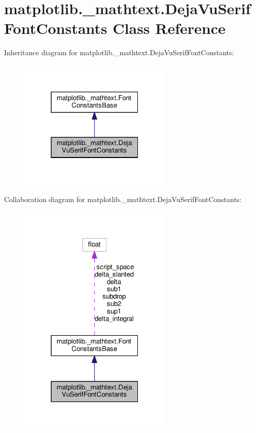 \hypertarget{classmatplotlib_1_1__mathtext_1_1DejaVuSerifFontConstants}{}\section{matplotlib.\+\_\+mathtext.\+Deja\+Vu\+Serif\+Font\+Constants Class Reference}
\label{classmatplotlib_1_1__mathtext_1_1DejaVuSerifFontConstants}


Inheritance diagram for matplotlib.\+\_\+mathtext.\+Deja\+Vu\+Serif\+Font\+Constants\+:
\nopagebreak
\begin{figure}[H]
\begin{center}
\leavevmode
\includegraphics[width=208pt]{classmatplotlib_1_1__mathtext_1_1DejaVuSerifFontConstants__inherit__graph}
\end{center}
\end{figure}


Collaboration diagram for matplotlib.\+\_\+mathtext.\+Deja\+Vu\+Serif\+Font\+Constants\+:
\nopagebreak
\begin{figure}[H]
\begin{center}
\leavevmode
\includegraphics[width=208pt]{classmatplotlib_1_1__mathtext_1_1DejaVuSerifFontConstants__coll__graph}
\end{center}
\end{figure}
